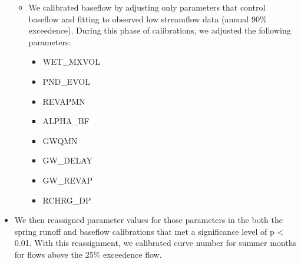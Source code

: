 \begin{itemize}
\begin{itemize}
\begin{itemize}
        \end{itemize}
    \end{itemize}
    \begin{itemize}
        \item We calibrated baseflow by adjusting only parameters that control
        baseflow and fitting to observed low streamflow data (annual 90\%
        exceedence).
        During this phase of calibrations, we adjusted the following parameters:
        \begin{itemize}
            \item WET\_MXVOL
            \item PND\_EVOL
            \item REVAPMN
            \item ALPHA\_BF
            \item GWQMN
            \item GW\_DELAY
            \item GW\_REVAP
            \item RCHRG\_DP
        \end{itemize}
    \end{itemize}
    \item We then reassigned parameter values for those parameters in the both
    the spring runoff and baseflow calibrations that met a significance level of
    p < 0.01. With this reassignment, we calibrated curve number for summer
    months for flows above the 25\% exceedence flow.
\end{itemize}
\pagebreak
